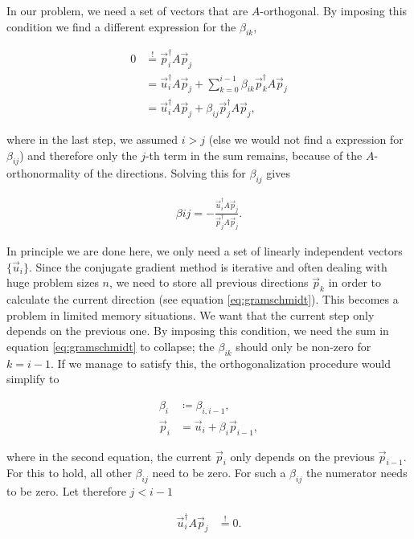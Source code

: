 \documentclass{article}
\theoremstyle{plain} %
\theoremstyle{convention} %
\theoremstyle{remark} %
\numberwithin{equation}{section}
\begin{document}
In our problem, we need a set of vectors that are $A$-orthogonal. By imposing this condition we find a different expression for the $\beta_{ik}$,

\begin{align*}
    0 &\stackrel{!}{=} \vec{p}_i^{\dagger} A \vec{p}_j \\
                    &= \vec{u}_i^{\dagger} A \vec{p}_j + \sum_{k=0}^{i-1} \beta_{ik} \vec{p}_k^{\dagger} A \vec{p}_j \\
                    &= \vec{u}_i^{\dagger} A \vec{p}_j + \beta_{ij} \vec{p}_j^{\dagger} A \vec{p}_j,
\end{align*}

where in the last step, we assumed $i>j$ (else we would not find a expression for $\beta_{ij}$) and therefore only the $j$-th term in the sum remains, because of the $A$-orthonormality of the directions. Solving this for $\beta_{ij}$ gives

\begin{align}
    \beta{ij} = - \frac{ \vec{u}_i^{\dagger} A \vec{p}_j }{ \vec{p}_j^{\dagger} A \vec{p}_j }. \label{eq:betas}
\end{align}

In principle we are done here, we only need a set of linearly independent vectors $\{\vec{u}_i\}$. Since the conjugate gradient method is iterative and often dealing with huge problem sizes $n$, we need to store all previous directions $\vec{p}_k$ in order to calculate the current direction (see equation \eqref{eq:gramschmidt}). This becomes a problem in limited memory situations. We want that the current step only depends on the previous one. By imposing this condition, we need the sum in equation \eqref{eq:gramschmidt} to collapse; the $\beta_{ik}$ should only be non-zero for $k=i-1$. If we manage to satisfy this, the orthogonalization procedure would simplify to

\begin{align*}
    \beta_i &\coloneqq \beta_{i, i-1}, \\
    \vec{p}_i &= \vec{u}_i + \beta_i \vec{p}_{i-1},
\end{align*}

where in the second equation, the current $\vec{p}_i$ only depends on the previous $\vec{p}_{i-1}$. For this to hold, all other $\beta_{ij}$ need to be zero. For such a $\beta_{ij}$ the numerator needs to be zero. Let therefore $j<i-1$

\begin{align*}
    \vec{u}_i^{\dagger} A \vec{p}_j &\stackrel{!}{=} 0.
\end{align*}
\end{document}

